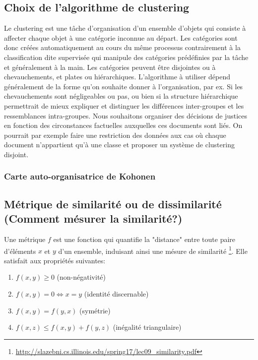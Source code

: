 \subsection{Choix de l’algorithme de clustering}

Le clustering est une tâche d’organisation d’un ensemble d’objets qui consiste à affecter chaque objet à une catégorie inconnue au départ. Les catégories sont donc créées automatiquement au cours du même processus contrairement à la classification dite supervisée qui manipule des catégories prédéfinies par la tâche et généralement à la main. Les catégories peuvent être disjointes ou à chevauchements, et plates ou hiérarchiques. 
L’algorithme à utiliser dépend généralement de la forme qu’on souhaite donner à l’organisation, par ex. Si les chevauchements sont négligeables ou pas, ou bien si la structure hiérarchique permettrait de mieux expliquer et distinguer les différences inter-groupes et les ressemblances intra-groupes. Nous souhaitons organiser des décisions de justices en fonction des circonstances factuelles auxquelles ces documents sont liés.  On pourrait par exemple faire une restriction des données aux cas où chaque document n’appartient qu’à une classe et proposer un système de clustering disjoint.

\subsubsection{Carte auto-organisatrice de Kohonen}


\subsection{Métrique de similarité ou de dissimilarité (Comment mésurer la similarité?)}
Une métrique $f$ est une fonction qui quantifie la "distance" entre toute paire d'éléments $x$ et $y$ d'un ensemble, induisant ainsi une mésure de similarité \footnote{\url{http://slazebni.cs.illinois.edu/spring17/lec09_similarity.pdf}}. Elle satisfait aux propriétés suivantes:
\begin{enumerate}
\item $f(x,y) \geq 0$ (non-négativité)
\item $f(x,y) = 0  \Leftrightarrow x = y$ (identité discernable)
\item $f(x,y) = f(y, x)$ (symétrie)
\item $f(x,z) \leq f(x,y) + f(y,z)$ (inégalité triangulaire) \label{enum:sim:ineq-tri}
\end{enumerate}

